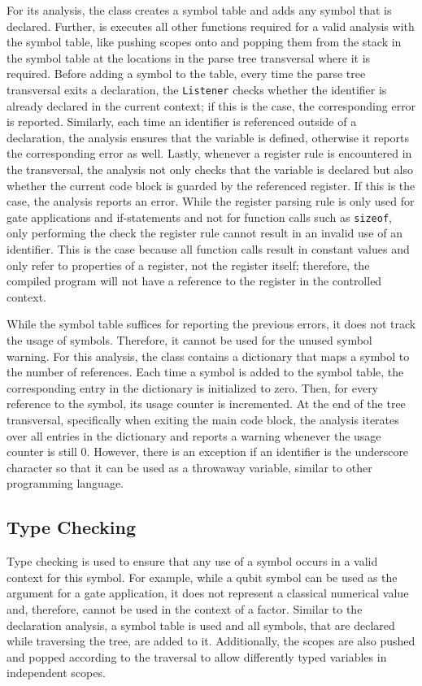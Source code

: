 For its analysis, the class creates a symbol table and adds any symbol that is declared. Further, is executes all other functions required for a valid analysis with the symbol table, like pushing scopes onto and popping them from the stack in the symbol table at the locations in the parse tree transversal where it is required. Before adding a symbol to the table, \ie every time the parse tree transversal exits a declaration, the \texttt{Listener} checks whether the identifier is already declared in the current context; if this is the case, the corresponding error is reported. Similarly, each time an identifier is referenced outside of a declaration, the analysis ensures that the variable is defined, otherwise it reports the corresponding error as well. Lastly, whenever a register rule is encountered in the transversal, the analysis not only checks that the variable is declared but also whether the current code block is guarded by the referenced register. If this is the case, the analysis reports an error. While the register parsing rule is only used for gate applications and if-statements and not for function calls such as \texttt{sizeof}, only performing the check the register rule cannot result in an invalid use of an identifier. This is the case because all function calls result in constant values and only refer to properties of a register, not the register itself; therefore, the compiled program will not have a reference to the register in the controlled context.

While the symbol table suffices for reporting the previous errors, it does not track the usage of symbols. Therefore, it cannot be used for the unused symbol warning. For this analysis, the class contains a dictionary that maps a symbol to the number of references. Each time a symbol is added to the symbol table, the corresponding entry in the dictionary is initialized to zero. Then, for every reference to the symbol, its usage counter is incremented. At the end of the tree transversal, specifically when exiting the main code block, the analysis iterates over all entries in the dictionary and reports a warning whenever the usage counter is still $0$. However, there is an exception if an identifier is the underscore character so that it can be used as a throwaway variable, similar to other programming language.  

\subsection{Type Checking}
\label{sec:implementation_typeCheckingAnalayis}
Type checking is used to ensure that any use of a symbol occurs in a valid context for this symbol. For example, while a qubit symbol can be used as the argument for a gate application, it does not represent a classical numerical value and, therefore, cannot be used in the context of a factor. Similar to the declaration analysis, a symbol table is used and all symbols, that are declared while traversing the tree, are added to it. Additionally, the scopes are also pushed and popped according to the traversal to allow differently typed variables in independent scopes.


